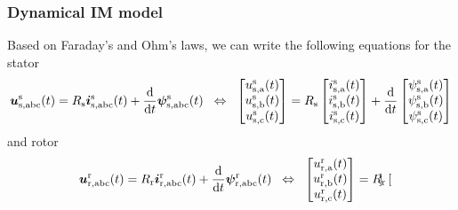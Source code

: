 \begin{frame}
	\frametitle{Dynamical IM model}
	Based on Faraday's and Ohm's laws, we can write the following equations for the stator
	\begin{equation}
		\bm{u}^\mathrm{s}_\mathrm{s,abc}(t) = R_\mathrm{s}\bm{i}^\mathrm{s}_\mathrm{s,abc}(t)+\frac{\mathrm{d}}{\mathrm{d}t}\bm{\psi}^\mathrm{s}_\mathrm{s,abc}(t) \hspace{0.2cm} \Leftrightarrow \hspace{0.2cm} \begin{bmatrix}
			u_{\mathrm{s,a}}^\mathrm{s}(t) \\
			u_{\mathrm{s,b}}^\mathrm{s}(t) \\
			u_{\mathrm{s,c}}^\mathrm{s}(t) \\
		\end{bmatrix} = R_\mathrm{s} \begin{bmatrix}
			i_{\mathrm{s,a}}^\mathrm{s}(t) \\
			i_{\mathrm{s,b}}^\mathrm{s}(t) \\
			i_{\mathrm{s,c}}^\mathrm{s}(t) \\
		\end{bmatrix} + \frac{\mathrm{d}}{\mathrm{d}t} \begin{bmatrix}
			\psi_{\mathrm{s,a}}^\mathrm{s}(t) \\
			\psi_{\mathrm{s,b}}^\mathrm{s}(t) \\
			\psi_{\mathrm{s,c}}^\mathrm{s}(t) \\
		\end{bmatrix}
		\label{eq:IM_stator_three_phase_voltage_equation}
	\end{equation}
	\pause
	and rotor
	\begin{equation}
		\bm{u}^\mathrm{r}_\mathrm{r,abc}(t) = R_\mathrm{r}\bm{i}^\mathrm{r}_\mathrm{r,abc}(t)+\frac{\mathrm{d}}{\mathrm{d}t}\bm{\psi}^\mathrm{r}_\mathrm{r,abc}(t) \hspace{0.2cm} \Leftrightarrow \hspace{0.2cm} \begin{bmatrix}
			u_{\mathrm{r,a}}^\mathrm{r}(t) \\
			u_{\mathrm{r,b}}^\mathrm{r}(t) \\
			u_{\mathrm{r,c}}^\mathrm{r}(t) \\
		\end{bmatrix} = R_\mathrm{r} \begin{bmatrix}

\end{bmatrix}
\end{equation}
\end{frame}
